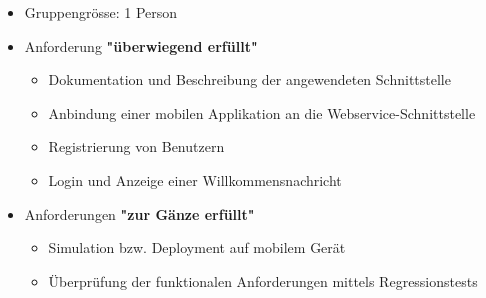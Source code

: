 \begin{itemize}
	\item Gruppengrösse: 1 Person
	\item Anforderung \textbf{"überwiegend erfüllt"}
	\begin{itemize}
		\item Dokumentation und Beschreibung der angewendeten Schnittstelle
		\item Anbindung einer mobilen Applikation an die Webservice-Schnittstelle
		\item Registrierung von Benutzern
		\item Login und Anzeige einer Willkommensnachricht
	\end{itemize}
	\item Anforderungen \textbf{"zur Gänze erfüllt"}
	\begin{itemize}
		\item Simulation bzw. Deployment auf mobilem Gerät
		\item Überprüfung der funktionalen Anforderungen mittels Regressionstests
	\end{itemize}
\end{itemize}
